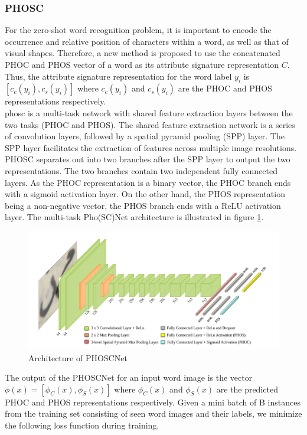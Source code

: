 \subsubsection{PHOSC}
For the zero-shot word recognition problem, it is important to encode the occurrence and relative position of characters within a word, as well as that of visual shapes. Therefore, a new method is proposed to use the concatenated PHOC and PHOS vector of a word as its attribute signature representation $C$. Thus, the attribute signature representation for the word label $y_i$ is $[c_c(y_i), c_s(y_i)]$ where $c_c(y_i)$ and $c_s(y_i)$ are the PHOC and PHOS representations respectively. \\

\acrfull{phosc} is a multi-task network with shared feature extraction layers between the two tasks (PHOC and PHOS). The shared feature extraction network is a series of convolution layers, followed by a spatial pyramid pooling (SPP) layer. The SPP layer facilitates the extraction of features across multiple image resolutions. PHOSC separates out into two branches after the SPP layer to output the two representations. The two branches contain two independent fully connected layers. As the PHOC representation is a binary vector, the PHOC branch ends with a sigmoid activation layer. On the other hand, the PHOS representation being a non-negative vector, the PHOS branch ends with a ReLU activation layer. The multi-task Pho(SC)Net architecture is illustrated in figure \ref{fig:phosc-arachitecture}.

\begin{figure}[!htb]
    \centering
    \includegraphics[width=16cm]{images/phosc-archiecture.png}
    \caption{Architecture of PHOSCNet}
    \label{fig:phosc-arachitecture}
\end{figure}

The output of the PHOSCNet for an input word image is the vector $\phi(x) = [\phi_C(x), \phi_S(x)]$ where $\phi_C(x)$ and $\phi_S(x)$ are the predicted PHOC and PHOS representations respectively. Given a mini batch of B instances from the training set consisting of seen word images and their labels, we minimize the following loss function during training.

